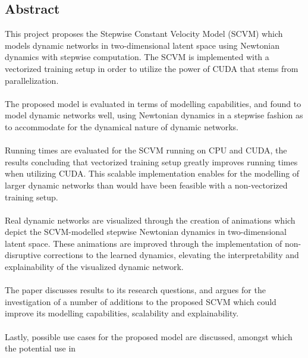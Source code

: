 \subsection*{Abstract}

This project proposes the Stepwise Constant Velocity Model (SCVM) which models dynamic networks in two-dimensional latent space using Newtonian dynamics with stepwise computation.
The SCVM is implemented with a vectorized training setup in order to utilize the power of CUDA that stems from parallelization.
\\\\
The proposed model is evaluated in terms of modelling capabilities, and found to model dynamic networks well, using Newtonian dynamics in a stepwise fashion as to accommodate for the dynamical nature of dynamic networks.
\\\\
Running times are evaluated for the SCVM running on CPU and CUDA, the results concluding that vectorized training setup greatly improves running times when utilizing CUDA.
This scalable implementation enables for the modelling of larger dynamic networks than would have been feasible with a non-vectorized training setup.
\\\\
Real dynamic networks are visualized through the creation of animations which depict the SCVM-modelled stepwise Newtonian dynamics in two-dimensional latent space.
These animations are improved through the implementation of non-disruptive corrections to the learned dynamics, elevating the interpretability and explainability of the visualized dynamic network.
\\\\
The paper discusses results to its research questions, and argues for the investigation of a number of additions to the proposed SCVM which could improve its modelling capabilities, scalability and explainability.
\\\\
Lastly, possible use cases for the proposed model are discussed, amongst which the potential use in 

